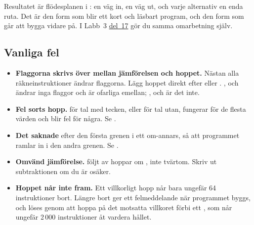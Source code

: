 Resultatet är flödesplanen i : en väg in, en väg ut, och varje alternativ en enda
ruta. Det är den form som blir ett kort och läsbart program, och den form som går att bygga vidare
på. I Labb~3 \hyperref[lab3:d17]{del~17} gör du samma omarbetning själv.

\subsection{Vanliga fel}
\label{c9:a9}
\begin{itemize}
  \item \textbf{Flaggorna skrivs över mellan jämförelsen och hoppet.} Nästan alla
    räkneinstruktioner ändrar flaggorna. Lägg hoppet direkt efter  eller .
    ,  och  ändrar inga flaggor och är ofarliga emellan;
    ,  och  är det inte.
  \item \textbf{Fel sorts hopp.}  för tal med tecken, eller  för tal utan,
    fungerar för de flesta värden och blir fel för några. Se .
  \item \textbf{Det saknade } efter den första grenen i ett om-annars, så att programmet
    ramlar in i den andra grenen. Se .
  \item \textbf{Omvänd jämförelse.}  följt av  hoppar om
    , inte tvärtom. Skriv ut subtraktionen om du är osäker.
  \item \textbf{Hoppet når inte fram.} Ett villkorligt hopp når bara ungefär 64 instruktioner
    bort. Längre bort ger ett felmeddelande när programmet byggs, och löses genom att hoppa på det
    motsatta villkoret förbi ett , som når ungefär 2\,000 instruktioner åt vardera
    hållet.
\end{itemize}
